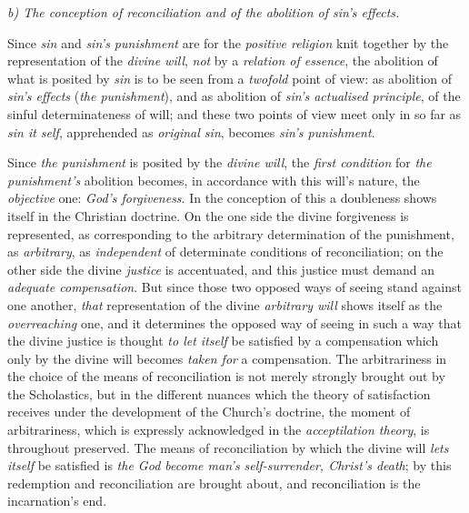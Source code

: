 \documentclass[12pt,a4paper]{book}
\begin{document}
\begin{center}
\emph{b) The conception of reconciliation and of the abolition of sin's effects.}
\end{center}

Since \emph{sin} and \emph{sin's punishment} are for the \emph{positive
religion} knit together by the representation of the \emph{divine will},
\emph{not} by a \emph{relation of essence}, the abolition of what is posited by
\emph{sin} is to be seen from a \emph{twofold} point of view: as abolition of
\emph{sin's effects} (\emph{the punishment}), and as abolition of \emph{sin's
actualised principle}, of the sinful determinateness of will; and these two
points of view meet only in so far as \emph{sin it\-%
self}, apprehended as \emph{original sin}, becomes \emph{sin's punishment}.

Since \emph{the punishment} is posited by the \emph{divine will}, the
\emph{first condition} for \emph{the punishment's} abolition becomes, in
accordance with this will's nature, the \emph{objective} one: \emph{God's
forgiveness}. In the conception of this a doubleness shows itself in the
Christian doctrine. On the one side the divine forgiveness is represented, as
corresponding to the arbitrary determination of the punishment, as
\emph{arbitrary}, as \emph{independent} of determinate conditions of
reconciliation; on the other side the divine \emph{justice} is accentuated, and
this justice must demand an \emph{adequate compensation}. But since those two
opposed ways of seeing stand against one another, \emph{that} representation of
the divine \emph{arbitrary will} shows itself as the \emph{overreaching} one,
and it determines the opposed way of seeing in such a way that the divine
justice is thought \emph{to let itself} be satisfied by a compensation which
only by the divine will becomes \emph{taken for} a compensation. The
arbitrariness in the choice of the means of reconciliation is not merely
strongly brought out by the Scholastics, but in the different nuances which the
theory of satisfaction receives under the development of the Church's doctrine,
the moment of arbitrariness, which is expressly acknowledged in the
\emph{acceptilation theory}, is throughout preserved. The means of
reconciliation by which the divine will \emph{lets itself} be satisfied is
\emph{the God become man's self-surrender, Christ's death}; by this redemption
and reconciliation are brought about, and reconciliation is the incarnation's
end.
\end{document}
